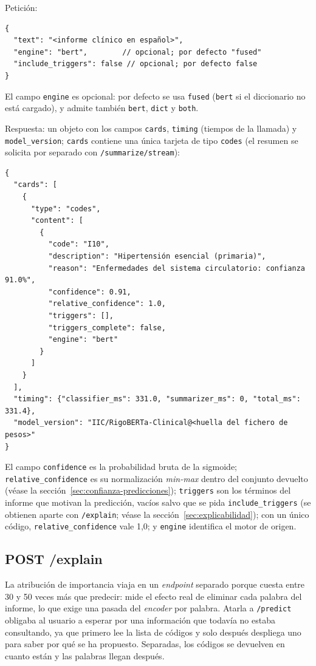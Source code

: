 Petición:

{\small
\begin{verbatim}
{
  "text": "<informe clínico en español>",
  "engine": "bert",        // opcional; por defecto "fused"
  "include_triggers": false // opcional; por defecto false
}
\end{verbatim}
}

El campo \texttt{engine} es opcional: por defecto se usa \texttt{fused} (\texttt{bert} si el diccionario no está cargado), y admite también \texttt{bert}, \texttt{dict} y \texttt{both}.

Respuesta: un objeto con los campos \texttt{cards}, \texttt{timing} (tiempos de la llamada) y \texttt{model\_version}; \texttt{cards} contiene una única tarjeta de tipo \texttt{codes} (el resumen se solicita por separado con \texttt{/summarize/stream}):

{\small
\begin{verbatim}
{
  "cards": [
    {
      "type": "codes",
      "content": [
        {
          "code": "I10",
          "description": "Hipertensión esencial (primaria)",
          "reason": "Enfermedades del sistema circulatorio: confianza 91.0%",
          "confidence": 0.91,
          "relative_confidence": 1.0,
          "triggers": [],
          "triggers_complete": false,
          "engine": "bert"
        }
      ]
    }
  ],
  "timing": {"classifier_ms": 331.0, "summarizer_ms": 0, "total_ms": 331.4},
  "model_version": "IIC/RigoBERTa-Clinical@<huella del fichero de pesos>"
}
\end{verbatim}
}

El campo \texttt{confidence} es la probabilidad bruta de la sigmoide; \texttt{relative\_confidence} es su normalización \emph{min-max} dentro del conjunto devuelto (véase la sección~\ref{sec:confianza-predicciones}); \texttt{triggers} son los términos del informe que motivan la predicción, vacíos salvo que se pida \texttt{include\_triggers} (se obtienen aparte con \texttt{/explain}; véase la sección~\ref{sec:explicabilidad}); con un único código, \texttt{relative\_confidence} vale 1,0; y \texttt{engine} identifica el motor de origen.

\subsection{POST /explain}\label{sec:m-explain}

La atribución de importancia viaja en un \emph{endpoint} separado porque cuesta entre 30 y 50 veces más que predecir: mide el efecto real de eliminar cada palabra del informe, lo que exige una pasada del \emph{encoder} por palabra. Atarla a \texttt{/predict} obligaba al usuario a esperar por una información que todavía no estaba consultando, ya que primero lee la lista de códigos y solo después despliega uno para saber por qué se ha propuesto. Separadas, los códigos se devuelven en cuanto están y las palabras llegan después.

